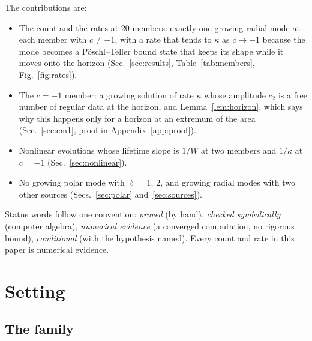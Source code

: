 \documentclass[11pt]{article}
\theoremstyle{plain}
\begin{document}
The contributions are:
\begin{itemize}
\item The count and the rates at 20 members: exactly one growing radial mode at each member with $c\ne-1$, with a rate that
  tends to $\kappa$ as $c\to-1$ because the mode becomes a Pöschl--Teller bound state that keeps its shape while it moves
  onto the horizon (Sec.~\ref{sec:results}, Table~\ref{tab:members}, Fig.~\ref{fig:rates}).
\item The $c=-1$ member: a growing solution of rate $\kappa$ whose amplitude $c_2$ is a free number of regular data at the
  horizon, and Lemma~\ref{lem:horizon}, which says why this happens only for a horizon at an extremum of the area
  (Sec.~\ref{sec:cm1}, proof in Appendix~\ref{app:proof}).
\item Nonlinear evolutions whose lifetime slope is $1/W$ at two members and $1/\kappa$ at $c=-1$ (Sec.~\ref{sec:nonlinear}).
\item No growing polar mode with $\ell=1$, $2$, and growing radial modes with two other sources (Secs.~\ref{sec:polar}
  and~\ref{sec:sources}).
\end{itemize}

Status words follow one convention: \emph{proved} (by hand), \emph{checked symbolically} (computer algebra), \emph{numerical
evidence} (a converged computation, no rigorous bound), \emph{conditional} (with the hypothesis named). Every count and rate
in this paper is numerical evidence.

\section{Setting}\label{sec:setting}

\subsection{The family}
\end{document}
